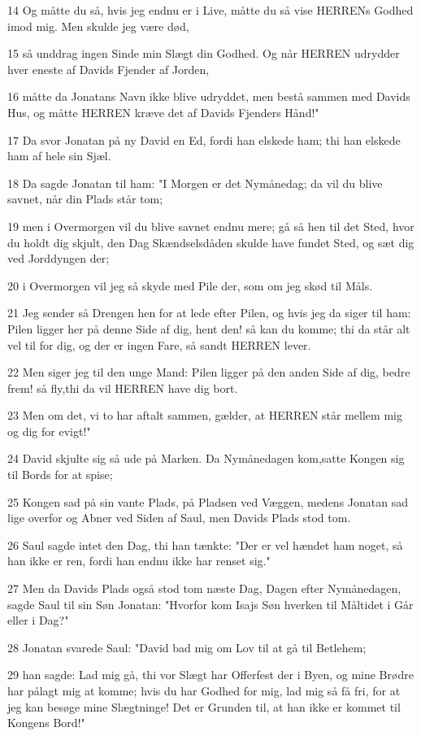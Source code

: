 \par 14 Og måtte du så, hvis jeg endnu er i Live, måtte du så vise HERRENs Godhed imod mig. Men skulde jeg være død,
\par 15 så unddrag ingen Sinde min Slægt din Godhed. Og når HERREN udrydder hver eneste af Davids Fjender af Jorden,
\par 16 måtte da Jonatans Navn ikke blive udryddet, men bestå sammen med Davids Hus, og måtte HERREN kræve det af Davids Fjenders Hånd!"
\par 17 Da svor Jonatan på ny David en Ed, fordi han elskede ham; thi han elskede ham af hele sin Sjæl.
\par 18 Da sagde Jonatan til ham: "I Morgen er det Nymånedag; da vil du blive savnet, når din Plads står tom;
\par 19 men i Overmorgen vil du blive savnet endnu mere; gå så hen til det Sted, hvor du holdt dig skjult, den Dag Skændselsdåden skulde have fundet Sted, og sæt dig ved Jorddyngen der;
\par 20 i Overmorgen vil jeg så skyde med Pile der, som om jeg skød til Måls.
\par 21 Jeg sender så Drengen hen for at lede efter Pilen, og hvis jeg da siger til ham: Pilen ligger her på denne Side af dig, hent den! så kan du komme; thi da står alt vel til for dig, og der er ingen Fare, så sandt HERREN lever.
\par 22 Men siger jeg til den unge Mand: Pilen ligger på den anden Side af dig, bedre frem! så fly,thi da vil HERREN have dig bort.
\par 23 Men om det, vi to har aftalt sammen, gælder, at HERREN står mellem mig og dig for evigt!"
\par 24 David skjulte sig så ude på Marken. Da Nymånedagen kom,satte Kongen sig til Bords for at spise;
\par 25 Kongen sad på sin vante Plads, på Pladsen ved Væggen, medens Jonatan sad lige overfor og Abner ved Siden af Saul, men Davids Plads stod tom.
\par 26 Saul sagde intet den Dag, thi han tænkte: "Der er vel hændet ham noget, så han ikke er ren, fordi han endnu ikke har renset sig."
\par 27 Men da Davids Plads også stod tom næste Dag, Dagen efter Nymånedagen, sagde Saul til sin Søn Jonatan: "Hvorfor kom Isajs Søn hverken til Måltidet i Går eller i Dag?"
\par 28 Jonatan svarede Saul: "David bad mig om Lov til at gå til Betlehem;
\par 29 han sagde: Lad mig gå, thi vor Slægt har Offerfest der i Byen, og mine Brødre har pålagt mig at komme; hvis du har Godhed for mig, lad mig så få fri, for at jeg kan besøge mine Slægtninge! Det er Grunden til, at han ikke er kommet til Kongens Bord!"
